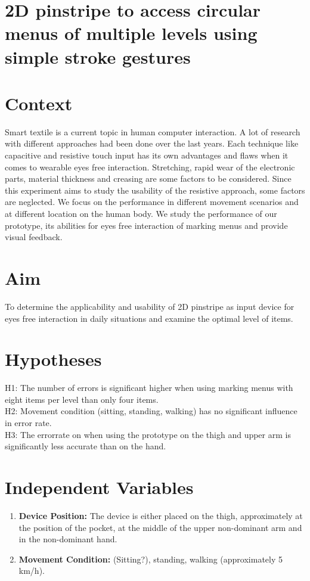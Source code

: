 \documentclass[10pt,a4paper,twocolumn]{article}
\begin{document}
\section*{\textbf{2D pinstripe to access circular menus of multiple levels using simple stroke gestures}}

\section*{Context}
Smart textile is a current topic in human computer interaction. A lot of research with different approaches had been done over the last years. Each technique like capacitive and resistive touch input has its own advantages and flaws when it comes to wearable eyes free interaction. Stretching, rapid wear of the electronic parts, material thickness and creasing are some factors to be considered. Since this experiment aims to study the usability of the resistive approach, some factors are neglected. We focus on the performance in different movement scenarios and at different location on the human body. We study the performance of our prototype, its abilities for eyes free interaction of marking menus and provide visual feedback.

\section*{Aim}
To determine the applicability and usability of 2D pinstripe as input device for eyes free interaction in daily situations and examine the optimal level of items. 

\section*{Hypotheses}
H1: The number of errors is significant higher when using marking menus with eight items per level than only four items.
\\
H2: Movement condition (sitting, standing, walking) has no significant influence in error rate.
\\
H3: The errorrate on when using the prototype on the thigh and upper arm is significantly less accurate than on the hand.

\section*{Independent Variables}
\begin{enumerate}
\item \textbf{Device Position:} The device is either placed on the thigh, approximately at the position of the pocket, at the middle of the upper non-dominant arm and in the non-dominant hand. 
\\
\item \textbf{Movement Condition:} (Sitting?), standing, walking (approximately 5 km/h).
\end{enumerate}
\end{document}
